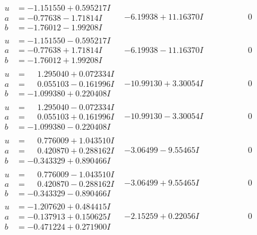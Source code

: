 \documentclass[1p]{elsarticle_modified}
\theoremstyle{definition}
\begin{document}
$$\begin{array}{c|c|c}
\begin{aligned}
u &= -1.151550 + 0.595217 I \\
a &= -0.77638 - 1.71814 I \\
b &= -1.76012 - 1.99208 I\end{aligned}
 & -6.19938 + 11.16370 I & \phantom{-0.000000 } 0 \\ \hline\begin{aligned}
u &= -1.151550 - 0.595217 I \\
a &= -0.77638 + 1.71814 I \\
b &= -1.76012 + 1.99208 I\end{aligned}
 & -6.19938 - 11.16370 I & \phantom{-0.000000 } 0 \\ \hline\begin{aligned}
u &= \phantom{-}1.295040 + 0.072334 I \\
a &= \phantom{-}0.055103 - 0.161996 I \\
b &= -1.099380 + 0.220408 I\end{aligned}
 & -10.99130 + 3.30054 I & \phantom{-0.000000 } 0 \\ \hline\begin{aligned}
u &= \phantom{-}1.295040 - 0.072334 I \\
a &= \phantom{-}0.055103 + 0.161996 I \\
b &= -1.099380 - 0.220408 I\end{aligned}
 & -10.99130 - 3.30054 I & \phantom{-0.000000 } 0 \\ \hline\begin{aligned}
u &= \phantom{-}0.776009 + 1.043510 I \\
a &= \phantom{-}0.420870 + 0.288162 I \\
b &= -0.343329 + 0.890466 I\end{aligned}
 & -3.06499 - 9.55465 I & \phantom{-0.000000 } 0 \\ \hline\begin{aligned}
u &= \phantom{-}0.776009 - 1.043510 I \\
a &= \phantom{-}0.420870 - 0.288162 I \\
b &= -0.343329 - 0.890466 I\end{aligned}
 & -3.06499 + 9.55465 I & \phantom{-0.000000 } 0 \\ \hline\begin{aligned}
u &= -1.207620 + 0.484415 I \\
a &= -0.137913 + 0.150625 I \\
b &= -0.471224 + 0.271900 I\end{aligned}
 & -2.15259 + 0.22056 I & \phantom{-0.000000 } 0 \\ \hline\begin{aligned}

\end{aligned}
\end{array}$$
\end{document}
